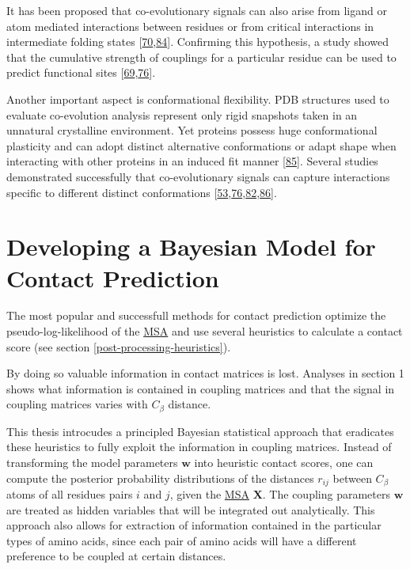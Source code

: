 \documentclass[12pt,a4paper,twoside]{book}
\newcommand{\Cb}{C_\beta}
\newcommand{\w}{\mathbf{w}}
\newcommand{\X}{\mathbf{X}}
\theoremstyle{definition}
\theoremstyle{definition}
\theoremstyle{remark}
\begin{document}
It has been proposed that co-evolutionary signals can also arise from
ligand or atom mediated interactions between residues or from critical
interactions in intermediate folding states
{[}\protect\hyperlink{ref-Buslje2009}{70},\protect\hyperlink{ref-Ovchinnikov2015b}{84}{]}.
Confirming this hypothesis, a study showed that the cumulative strength
of couplings for a particular residue can be used to predict functional
sites
{[}\protect\hyperlink{ref-Marks2012}{69},\protect\hyperlink{ref-Hopf2012}{76}{]}.

Another important aspect is conformational flexibility. PDB structures
used to evaluate co-evolution analysis represent only rigid snapshots
taken in an unnatural crystalline environment. Yet proteins possess huge
conformational plasticity and can adopt distinct alternative
conformations or adapt shape when interacting with other proteins in an
induced fit manner {[}\protect\hyperlink{ref-Noel2016}{85}{]}. Several
studies demonstrated successfully that co-evolutionary signals can
capture interactions specific to different distinct conformations
{[}\protect\hyperlink{ref-Morcos2011}{53},\protect\hyperlink{ref-Hopf2012}{76},\protect\hyperlink{ref-Jana2014}{82},\protect\hyperlink{ref-Sfriso2016}{86}{]}.

\section{Developing a Bayesian Model for Contact
Prediction}\label{developing-a-bayesian-model-for-contact-prediction}

The most popular and successfull methods for contact prediction optimize
the pseudo-log-likelihood of the \protect\hyperlink{abbrev}{MSA} and use
several heuristics to calculate a contact score (see section
\ref{post-processing-heuristics}).

By doing so valuable information in contact matrices is lost. Analyses
in section 1 shows what information is contained in coupling matrices
and that the signal in coupling matrices varies with \(\Cb\) distance.

This thesis introcudes a principled Bayesian statistical approach that
eradicates these heuristics to fully exploit the information in coupling
matrices. Instead of transforming the model parameters \(\w\) into
heuristic contact scores, one can compute the posterior probability
distributions of the distances \(r_{ij}\) between \(\Cb\) atoms of all
residues pairs \(i\) and \(j\), given the
\protect\hyperlink{abbrev}{MSA} \(\X\). The coupling parameters \(\w\)
are treated as hidden variables that will be integrated out
analytically. This approach also allows for extraction of information
contained in the particular types of amino acids, since each pair of
amino acids will have a different preference to be coupled at certain
distances.
\end{document}
